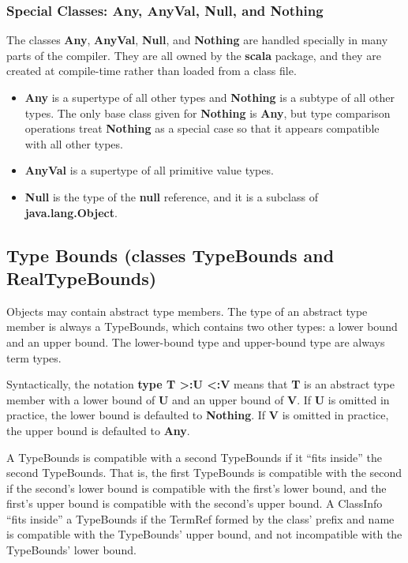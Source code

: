\documentclass[11pt]{report}
\newcommand{\cdf}{\bf\ttfamily} %
\newcommand{\cd}{\cdf\small}  %
\begin{document}
\subsubsection{Special Classes: Any, AnyVal, Null, and Nothing}

The classes {\cd Any}, {\cd AnyVal}, {\cd Null}, and {\cd Nothing} are handled specially in many parts of the compiler. They are all owned by the {\cd scala} package, and they are created at compile-time rather than loaded from a class file.

\begin{itemize}

\item {\cd Any} is a supertype of all other types and {\cd Nothing} is a subtype of all other types. The only base class given for {\cd Nothing} is {\cd Any}, but type comparison operations treat {\cd Nothing} as a special case so that it appears compatible with all other types.

\item {\cd AnyVal} is a supertype of all primitive value types.

\item {\cd Null} is the type of the {\cd null} reference, and it is a subclass of {\cd java.lang.Object}.

\end{itemize}

\subsection{Type Bounds (classes TypeBounds and RealTypeBounds)}

Objects may contain abstract type members.
The type of an abstract type member is always a TypeBounds, which contains two other types: a lower bound and an upper bound. The lower-bound type and upper-bound type are always term types.

Syntactically, the notation {\cd type T >:U <:V} means that {\cd T} is an abstract type member with a lower bound of {\cd U} and an upper bound of {\cd V}. If {\cd U} is omitted in practice, the lower bound is defaulted to {\cd Nothing}. If {\cd V} is omitted in practice, the upper bound is defaulted to {\cd Any}.

A TypeBounds is compatible with a second TypeBounds if it ``fits inside'' the second TypeBounds. That is, the first TypeBounds is compatible with the second if the second's lower bound is compatible with the first's lower bound, and the first's upper bound is compatible with the second's upper bound. A ClassInfo ``fits inside'' a TypeBounds if the TermRef formed by the class' prefix and name is compatible with the TypeBounds' upper bound, and not incompatible with the TypeBounds' lower bound.
\end{document}
